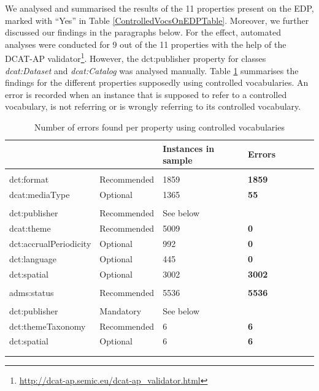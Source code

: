 \documentclass[<options>]{elsarticle}
\begin{document}
We analysed and summarised the results of the 11 properties present on the EDP, marked with “Yes” in Table \ref{ControlledVocsOnEDPTable}. Moreover, we further discussed our findings in the paragraphs below. For the effect, automated analyses were conducted for 9 out of the 11 properties with the help of the DCAT-AP validator\footnote{\href{  http://dcat-ap.semic.eu/dcat-ap\_validator.html }{    http://dcat-ap.semic.eu/dcat-ap\_validator.html}}. However, the dct:publisher property for classes \textit{dcat:Dataset} and \textit{dcat:Catalog} was analysed manually. 
Table \ref{ControlledVocsErrors} summarises the findings for the different properties supposedly using controlled vocabularies. An error is recorded when an instance that is supposed to refer to a controlled vocabulary, is not referring or is wrongly referring to its controlled vocabulary.

\begin{longtable}{*8l}
\rowcolor{white!10}{\textbf{Property}} & {} & {\textbf{Instances in sample}} & {\textbf{Errors}} \\ \hline
\rowcolor{gray!10}{Distribution} & {} & {} & {} \\ \hline
\rowcolor{white!10} dct:format &Recommended &1859 &\textbf{1859} \\ \hline
\rowcolor{white!10} dcat:mediaType &Optional &1365 &\textbf{55} \\ \hline
\rowcolor{gray!10}{Dataset} & {} & {} & {} \\ \hline
\rowcolor{white!10} dct:publisher &Recommended &See below \\ \hline
\rowcolor{white!10} dcat:theme &Recommended &5009 &\textbf{0} \\ \hline
\rowcolor{white!10} dct:accrualPeriodicity &Optional &992 &\textbf{0} \\ \hline
\rowcolor{white!10} dct:language &Optional &445 &\textbf{0} \\ \hline
\rowcolor{white!10} dct:spatial &Optional &3002 &\textbf{3002} \\ \hline
\rowcolor{gray!10}{CatalogRecord} & {} & {} & {} \\ \hline
\rowcolor{white!10} adms:status &Recommended &5536 &\textbf{5536} \\ \hline
\rowcolor{gray!10}{Catalog} & {} & {} & {} \\ \hline
\rowcolor{white!10} dct:publisher &Mandatory &See below\\ \hline
\rowcolor{white!10} dct:themeTaxonomy &Recommended &6 &\textbf{6} \\ \hline
\rowcolor{white!10} dct:spatial &Optional &6 &\textbf{6} \\ \hline
\\
\caption{Number of errors found per property using controlled vocabularies }\label{ControlledVocsErrors}
\end{longtable}
\end{document}
